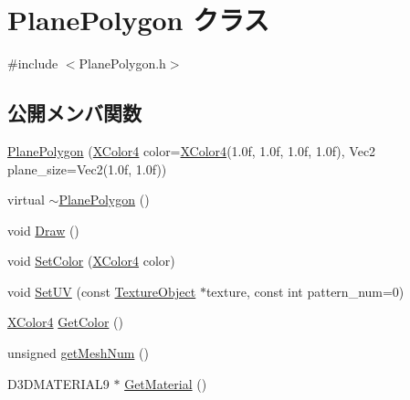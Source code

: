 \hypertarget{class_plane_polygon}{}\section{Plane\+Polygon クラス}
\label{class_plane_polygon}


{\ttfamily \#include $<$Plane\+Polygon.\+h$>$}

\subsection*{公開メンバ関数}
\begin{DoxyCompactItemize}
\item 
\mbox{\hyperlink{class_plane_polygon_a27987c23a242840b142e0fa11650daf6}{Plane\+Polygon}} (\mbox{\hyperlink{_vector3_d_8h_a680c30c4a07d86fe763c7e01169cd6cc}{X\+Color4}} color=\mbox{\hyperlink{_vector3_d_8h_a680c30c4a07d86fe763c7e01169cd6cc}{X\+Color4}}(1.\+0f, 1.\+0f, 1.\+0f, 1.\+0f), Vec2 plane\+\_\+size=\+Vec2(1.\+0f, 1.\+0f))
\item 
virtual \mbox{\hyperlink{class_plane_polygon_ac91d7ac1ceb00239f54b543690a78dab}{$\sim$\+Plane\+Polygon}} ()
\item 
void \mbox{\hyperlink{class_plane_polygon_a2f20691ee0feee4fa428f5d017d7062a}{Draw}} ()
\item 
void \mbox{\hyperlink{class_plane_polygon_a55307fc341641d7fd42fe2269acbd113}{Set\+Color}} (\mbox{\hyperlink{_vector3_d_8h_a680c30c4a07d86fe763c7e01169cd6cc}{X\+Color4}} color)
\item 
void \mbox{\hyperlink{class_plane_polygon_a081458fcb9e758dd8be5b027c66a92ad}{Set\+UV}} (const \mbox{\hyperlink{class_texture_object}{Texture\+Object}} $\ast$texture, const int pattern\+\_\+num=0)
\item 
\mbox{\hyperlink{_vector3_d_8h_a680c30c4a07d86fe763c7e01169cd6cc}{X\+Color4}} \mbox{\hyperlink{class_plane_polygon_ac4f8f7b51acdb744231efd342d3b2734}{Get\+Color}} ()
\item 
unsigned \mbox{\hyperlink{class_plane_polygon_a494068044805bdd4054bc69328c71d7f}{get\+Mesh\+Num}} ()
\item 
D3\+D\+M\+A\+T\+E\+R\+I\+A\+L9 $\ast$ \mbox{\hyperlink{class_plane_polygon_a808087c9d82c0eb7cfb0709c9906e833}{Get\+Material}} ()
\end{DoxyCompactItemize}
